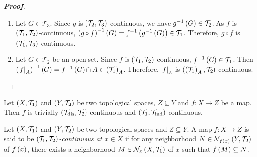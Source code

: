 \begin{proposition}
\begin{proof}[\rm\textbf{Proof}]
\begin{enumerate}
      \item Let $G\in\mathcal{T}_3$. Since $g$ is $\left(\mathcal{T}_2,\mathcal{T}_3\right)$-continuous, we have $g^{-1}\left(G\right)\in\mathcal{T}_2$. As $f$ is $\left(\mathcal{T}_1,\mathcal{T}_2\right)$-continuous, $\left(g\circ f\right)^{-1}\left(G\right)=f^{-1}\left(g^{-1}\left(G\right)\right)\in\mathcal{T}_1$. Therefore, $g\circ f$ is $\left(\mathcal{T}_1,\mathcal{T}_3\right)$-continuous.
      \item Let $G\in\mathcal{T}_2$ be an open set. Since $f$ is $\left(\mathcal{T}_1,\mathcal{T}_2\right)$-continuous, $f^{-1}\left(G\right)\in\mathcal{T}_1$. Then $\left(\left.f\right|_{A}\right)^{-1}\left(G\right)=f^{-1}\left(G\right)\cap A\in\left(\mathcal{T}_1\right)_A$. Therefore, $\left.f\right|_{A}$ is $\left(\left(\mathcal{T}_1\right)_A,\mathcal{T}_2\right)$-continuous.
    \end{enumerate}
  \end{proof}
\end{proposition}

\begin{example}
  Let $\left(X,\mathcal{T}_1\right)$ and $\left(Y,\mathcal{T}_2\right)$ be two topological spaces, $Z\subseteq Y$ and $f:X\rightarrow Z$ be a map. Then $f$ is trivially $\left(\mathcal{T}_{\text{dis}},\mathcal{T}_2\right)$-continuous and $\left(\mathcal{T}_1,\mathcal{T}_{\text{ind}}\right)$-continuous.
\end{example}

\begin{definition}
  Let $\left(X,\mathcal{T}_1\right)$ and $\left(Y,\mathcal{T}_2\right)$ be two topological spaces and $Z\subseteq Y$. A map $f:X\rightarrow Z$ is said to be \textit{$\left(\mathcal{T}_1,\mathcal{T}_2\right)$-continuous at $x\in X$} if for any neighborhood $N\in\mathcal{N}_{f\left(x\right)}\left(Y,\mathcal{T}_2\right)$ of $f\left(x\right)$, there exists a neighborhood $M\in\mathcal{N}_x\left(X,\mathcal{T}_1\right)$ of $x$ such that $f\left(M\right)\subseteq N$.
\end{definition}

